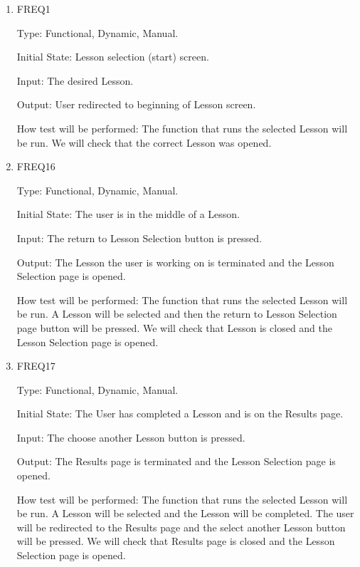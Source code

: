 \documentclass[12pt, titlepage]{article}
\begin{document}
\begin{enumerate}

\item{FREQ1\\}

Type: Functional, Dynamic, Manual.
					
Initial State: Lesson selection (start) screen.
					
Input: The desired Lesson.
					
Output: User redirected to beginning of Lesson screen.
					
How test will be performed: The function that runs the selected Lesson will be run. We will check that the correct Lesson was opened.

\item{{\color{cyan}FREQ16}\\}
{\color{cyan}
Type: Functional, Dynamic, Manual.
					
Initial State: The user is in the middle of a Lesson.
					
Input: The return to Lesson Selection button is pressed.
					
Output: The Lesson the user is working on is terminated and the Lesson Selection page is opened.
					
How test will be performed: The function that runs the selected Lesson will be run. A Lesson will be selected and then the return to Lesson Selection page button will be pressed. We will check that Lesson is closed and the Lesson Selection page is opened.
}

\item{{\color{cyan}FREQ17}\\}
{\color{cyan}
Type: Functional, Dynamic, Manual.
					
Initial State: The User has completed a Lesson and is on the Results page.
					
Input: The choose another Lesson button is pressed.
					
Output: The Results page is terminated and the Lesson Selection page is opened.
					
How test will be performed: The function that runs the selected Lesson will be run. A Lesson will be selected and the Lesson will be completed. The user will be redirected to the Results page and the select another Lesson button will be pressed. We will check that Results page is closed and the Lesson Selection page is opened.
}
\end{enumerate}
\end{document}
